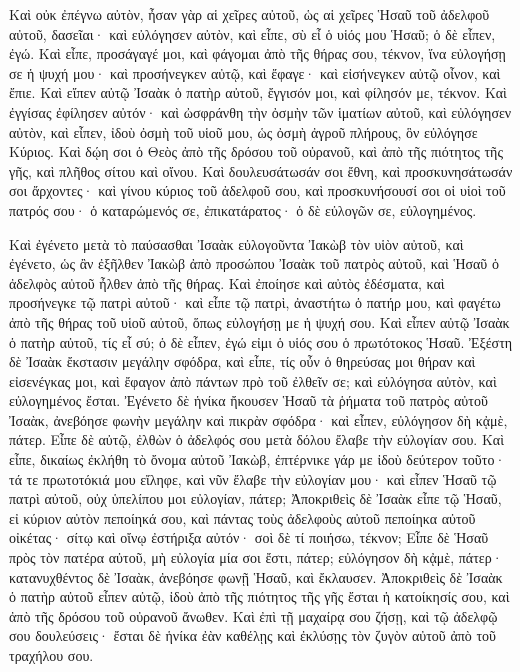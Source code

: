 {Καὶ οὐκ ἐπέγνω αὐτὸν, ἦσαν γὰρ αἱ χεῖρες αὐτοῦ, ὡς αἱ χεῖρες Ἡσαῦ τοῦ ἀδελφοῦ αὐτοῦ, δασεῖαι· καὶ εὐλόγησεν αὐτὸν,
καὶ εἶπε, σὺ εἶ ὁ υἱός μου Ἡσαῦ; ὁ δὲ εἶπεν, ἐγώ.
Καὶ εἶπε, προσάγαγέ μοι, καὶ φάγομαι ἀπὸ τῆς θήρας σου, τέκνον, ἵνα εὐλογήσῃ σε ἡ ψυχή μου· καὶ προσήνεγκεν αὐτῷ, καὶ ἔφαγε· καὶ εἰσήνεγκεν αὐτῷ οἶνον, καὶ ἔπιε.
Καὶ εἴπεν αὐτῷ Ἰσαὰκ ὁ πατὴρ αὐτοῦ, ἔγγισόν μοι, καὶ φίλησόν με, τέκνον.
Καὶ ἐγγίσας ἐφίλησεν αὐτόν· καὶ ὠσφράνθη τὴν ὀσμὴν τῶν ἱματίων αὐτοῦ, καὶ εὐλόγησεν αὐτὸν, καὶ εἶπεν, ἰδοὺ ὀσμὴ τοῦ υἱοῦ μου, ὡς ὀσμὴ ἀγροῦ πλήρους, ὃν εὐλόγησε Κύριος.
Καὶ δῴη σοι ὁ Θεὸς ἀπὸ τῆς δρόσου τοῦ οὐρανοῦ, καὶ ἀπὸ τῆς πιότητος τῆς γῆς, καὶ πλῆθος σίτου καὶ οἴνου.
Καὶ δουλευσάτωσάν σοι ἔθνη, καὶ προσκυνησάτωσάν σοι ἄρχοντες· καὶ γίνου κύριος τοῦ ἀδελφοῦ σου, καὶ προσκυνήσουσί σοι οἱ υἱοὶ τοῦ πατρός σου· ὁ καταρώμενός σε, ἐπικατάρατος· ὁ δὲ εὐλογῶν σε, εὐλογημένος.
\par }{\PP {}Καὶ ἐγένετο μετὰ τὸ παύσασθαι Ἰσαὰκ εὐλογοῦντα Ἰακὼβ τὸν υἱὸν αὐτοῦ, καὶ ἐγένετο, ὡς ἂν ἐξῆλθεν Ἰακὼβ ἀπὸ προσώπου Ἰσαὰκ τοῦ πατρὸς αὐτοῦ, καὶ Ἡσαῦ ὁ ἀδελφὸς αὐτοῦ ἦλθεν ἀπὸ τῆς θήρας.
Καὶ ἐποίησε καὶ αὐτὸς ἐδέσματα, καὶ προσήνεγκε τῷ πατρὶ αὐτοῦ· καὶ εἶπε τῷ πατρὶ, ἀναστήτω ὁ πατήρ μου, καὶ φαγέτω ἀπὸ τῆς θήρας τοῦ υἱοῦ αὐτοῦ, ὅπως εὐλογήσῃ με ἡ ψυχή σου.
Καὶ εἶπεν αὐτῷ Ἰσαὰκ ὁ πατὴρ αὐτοῦ, τίς εἶ σύ; ὁ δὲ εἶπεν, ἐγώ εἰμι ὁ υἱός σου ὁ πρωτότοκος Ἡσαῦ.
Ἐξέστη δὲ Ἰσαὰκ ἔκστασιν μεγάλην σφόδρα, καὶ εἶπε, τίς οὖν ὁ θηρεύσας μοι θήραν καὶ εἰσενέγκας μοι, καὶ ἔφαγον ἀπὸ πάντων πρὸ τοῦ ἐλθεῖν σε; καὶ εὐλόγησα αὐτὸν, καὶ εὐλογημένος ἔσται.
Ἐγένετο δὲ ἡνίκα ἤκουσεν Ἡσαῦ τὰ ῥήματα τοῦ πατρὸς αὐτοῦ Ἰσαὰκ, ἀνεβόησε φωνὴν μεγάλην καὶ πικρὰν σφόδρα· καὶ εἶπεν, εὐλόγησον δὴ κᾀμὲ, πάτερ.
Εἶπε δὲ αὐτῷ, ἐλθὼν ὁ ἀδελφός σου μετὰ δόλου ἔλαβε τὴν εὐλογίαν σου.
Καὶ εἶπε, δικαίως ἐκλήθη τὸ ὄνομα αὐτοῦ Ἰακὼβ, ἐπτέρνικε γάρ με ἰδοὺ δεύτερον τοῦτο· τά τε πρωτοτόκιά μου εἴληφε, καὶ νῦν ἔλαβε τὴν εὐλογίαν μου· καὶ εἶπεν Ἡσαῦ τῷ πατρὶ αὐτοῦ, οὐχ ὑπελίπου μοι εὐλογίαν, πάτερ;
Ἀποκριθεὶς δὲ Ἰσαὰκ εἶπε τῷ Ἡσαῦ, εἰ κύριον αὐτὸν πεποίηκά σου, καὶ πάντας τοὺς ἀδελφοὺς αὐτοῦ πεποίηκα αὐτοῦ οἰκέτας· σίτῳ καὶ οἴνῳ ἐστήριξα αὐτόν· σοὶ δὲ τί ποιήσω, τέκνον;
Εἶπε δὲ Ἡσαῦ πρὸς τὸν πατέρα αὐτοῦ, μὴ εὐλογία μία σοι ἔστι, πάτερ; εὐλόγησον δὴ κᾀμὲ, πάτερ· κατανυχθέντος δὲ Ἰσαὰκ, ἀνεβόησε φωνῇ Ἡσαῦ, καὶ ἔκλαυσεν.
Ἀποκριθεὶς δὲ Ἰσαὰκ ὁ πατὴρ αὐτοῦ εἶπεν αὐτῷ, ἰδοὺ ἀπὸ τῆς πιότητος τῆς γῆς ἔσται ἡ κατοίκησίς σου, καὶ ἀπὸ τῆς δρόσου τοῦ οὐρανοῦ ἄνωθεν.
Καὶ ἐπὶ τῇ μαχαίρᾳ σου ζήσῃ, καὶ τῷ ἀδελφῷ σου δουλεύσεις· ἔσται δὲ ἡνίκα ἐὰν καθέλῃς καὶ ἐκλύσῃς τὸν ζυγὸν αὐτοῦ ἀπὸ τοῦ τραχήλου σου.
}
